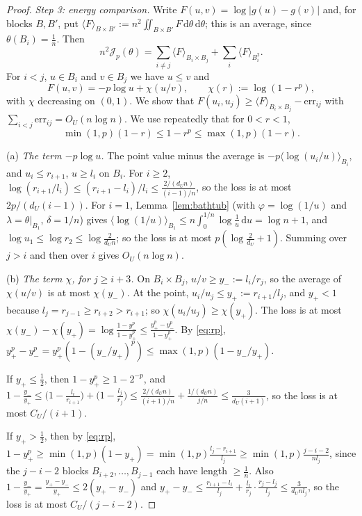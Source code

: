 \documentclass{amsart}
\theoremstyle{definition}
\theoremstyle{remark}
\numberwithin{equation}{section}
\newcommand{\cJ}{\mathcal{J}}
\newcommand{\dd}{\,\mathrm{d}}
\begin{document}
\begin{proof}
\emph{Step 3: energy comparison.} Write $F(u,v)=\log|g(u)-g(v)|$ and, for blocks $B,B'$, put
$\langle F\rangle_{B\times B'}:=n^2\iint_{B\times B'}F\dd\theta\dd\theta$; this is an average, since
$\theta(B_i)=\frac1n$.
Then
\[
  n^2\cJ_p(\theta)=\sum_{i\ne j}\langle F\rangle_{B_i\times B_j}+\sum_i\langle F\rangle_{B_i^2}.
\]
For $i<j$,
$u\in B_i$ and $v\in B_j$ we have $u\le v$ and
\[
  F(u,v)=-p\log u+\chi(u/v),\qquad \chi(r):=\log(1-r^p),
\]
with $\chi$ decreasing on $(0,1)$. We show that $F(u_i,u_j)\ge\langle F\rangle_{B_i\times B_j}-\mathrm{err}_{ij}$
with $\sum_{i<j}\mathrm{err}_{ij}=O_U(n\log n)$. We use repeatedly that for $0<r<1$,
\begin{equation}\label{eq:rp}
  \min(1,p)(1-r)\le1-r^p\le\max(1,p)(1-r).
\end{equation}

(a) \emph{The term $-p\log u$.} The point value minus the average is $-p\langle\log(u_i/u)\rangle_{B_i}$, and
$u_i\le r_{i+1}$, $u\ge l_i$ on $B_i$. For $i\ge2$, $\log(r_{i+1}/l_i)\le(r_{i+1}-l_i)/l_i\le\frac{2/(d_Un)}{(i-1)/n}$,
so the loss is at most $2p/(d_U(i-1))$. For $i=1$, Lemma~\ref{lem:bathtub} (with $\varphi=\log(1/u)$ and
$\lambda=\theta|_{B_1}$, $\delta=1/n$) gives $\langle\log(1/u)\rangle_{B_1}\le n\int_0^{1/n}\log\frac1u\dd u=\log n+1$,
and $\log u_1\le\log r_2\le\log\frac2{d_Un}$; so the loss is at most $p(\log\frac2{d_U}+1)$. Summing over $j>i$ and
then over $i$ gives $O_U(n\log n)$.

(b) \emph{The term $\chi$, for $j\ge i+3$.} On $B_i\times B_j$, $u/v\ge y_-:=l_i/r_j$, so the average of $\chi(u/v)$ is at most
$\chi(y_-)$. At the point, $u_i/u_j\le y_+:=r_{i+1}/l_j$, and $y_+<1$ because $l_j=r_{j-1}\ge r_{i+2}>r_{i+1}$; so
$\chi(u_i/u_j)\ge\chi(y_+)$. The loss is at most $\chi(y_-)-\chi(y_+)=\log\frac{1-y_-^p}{1-y_+^p}\le\frac{y_+^p-y_-^p}{1-y_+^p}$. By
\eqref{eq:rp}, $y_+^p-y_-^p=y_+^p(1-(y_-/y_+)^p)\le\max(1,p)(1-y_-/y_+)$.

If $y_+\le\frac12$, then $1-y_+^p\ge1-2^{-p}$, and
$1-\frac{y_-}{y_+}\le\bigl(1-\frac{l_i}{r_{i+1}}\bigr)+\bigl(1-\frac{l_j}{r_j}\bigr)\le\frac{2/(d_Un)}{(i+1)/n}+
\frac{1/(d_Un)}{j/n}\le\frac{3}{d_U(i+1)}$, so the loss is at most $C_U/(i+1)$.

If $y_+>\frac12$, then by \eqref{eq:rp}, $1-y_+^p\ge\min(1,p)(1-y_+)=\min(1,p)\frac{l_j-r_{i+1}}{l_j}\ge
\min(1,p)\frac{j-i-2}{nl_j}$, since the $j-i-2$ blocks $B_{i+2},\dots,B_{j-1}$ each have length $\ge\frac1n$. Also
$1-\frac{y_-}{y_+}=\frac{y_+-y_-}{y_+}\le2(y_+-y_-)$ and $y_+-y_-\le\frac{r_{i+1}-l_i}{l_j}+\frac{l_i}{r_j}\cdot\frac{r_j-l_j}{l_j}\le
\frac{3}{d_Unl_j}$, so the loss is at most $C_U/(j-i-2)$.


\end{proof}
\end{document}
